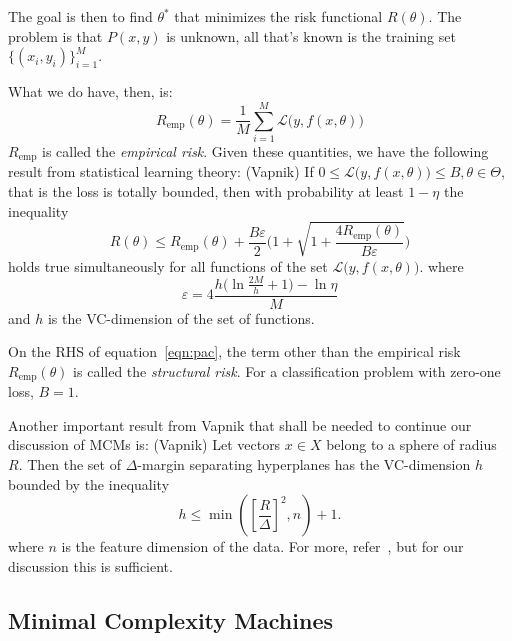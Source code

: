 \documentclass[11pt]{article}
\begin{document}
The goal is then to find $\theta^*$ that minimizes the risk functional
$R(\theta)$. The problem is that $P(x,y)$ is unknown, all that's known is the
training set $\{(x_i,y_i)\}_{i=1}^M$.\par
What we do have, then, is:
\begin{equation}
    R_{\text{emp}}(\theta)=\frac{1}{M}\sum_{i=1}^M
    \mathcal{L}\bigl(y,f(x,\theta)\bigr)
\end{equation}
$R_{\text{emp}}$ is called the {\em empirical risk}. Given these quantities, we
have the following result from statistical learning theory:
{\theorem (Vapnik) If $0\le\mathcal{L}\bigl(y,f(x,\theta)\bigr)\le
B,\theta\in\Theta$, that is the loss is totally bounded, then with
probability at least $1-\eta$ the inequality
\begin{equation}
    \label{eqn:pac}
    R(\theta)\le
    R_{\text{emp}}(\theta)+\frac{B\varepsilon}{2}\Biggl(1+\sqrt{1+\frac{4R_{\text{emp}}(\theta)}{B\varepsilon}}\Biggr)
\end{equation}
holds true simultaneously for all functions of the set
$\mathcal{L}\bigl(y,f(x,\theta)\bigr)$. where
\begin{equation}
    \label{eq:vareps}
    \varepsilon = 4\frac{h\biggl(\ln\frac{2M}{h}+1\biggr)-\ln\eta}{M}
\end{equation} and $h$ is the VC\nobreakdash-dimension of the set of functions.}\par
On the RHS of equation~\ref{eqn:pac}, the term other than the empirical risk
$R_{\text{emp}}(\theta)$ is called the {\em structural risk}. For a classification problem with zero\nobreakdash-one loss, $B=1$.\par
Another important result from Vapnik that shall be needed to continue our
discussion of MCMs is:
{\theorem (Vapnik) Let vectors $x\in X$ belong to a sphere of radius $R$. Then
the set of $\Delta$\nobreakdash-margin separating hyperplanes has the VC\nobreakdash-dimension $h$
bounded by the inequality
\begin{equation}
    \label{eqn:vcbound}
    h\le\min\left(\left[\frac{R}{\Delta}\right]^2,n\right)+1.
\end{equation}} where $n$ is the feature dimension of the data.
For more, refer~\cite{slt}, but for our discussion this is sufficient.\par
\subsection{Minimal Complexity Machines~\cite{MCM}}
\end{document}
